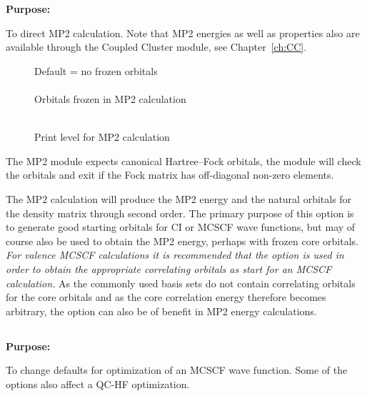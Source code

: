 {\bf Purpose:}

To direct MP2 calculation. Note that MP2 energies as well as
properties also are available through the Coupled Cluster module, see
Chapter~\ref{ch:CC}.

\begin{description}
\item[]
  Default = no frozen orbitals\\
   \\
  Orbitals frozen in MP2 calculation

\item[]
   \\
  Print level for MP2 calculation
\end{description}




The MP2 module expects canonical Hartree--Fock
orbitals, the module will
check the orbitals and exit if the Fock matrix has off-diagonal non-zero
elements.

The MP2 calculation will produce the MP2 energy and the natural orbitals
for the density matrix through second order.  The primary purpose of
this option is to generate good starting orbitals for CI or MCSCF wave
functions, but
may of course also be used to obtain the MP2 energy, perhaps with frozen
core orbitals. {\em For valence MCSCF calculations it is recommended that the
 option is used in order to obtain the appropriate
correlating orbitals as start
for an MCSCF calculation.\/}  As the commonly
used basis sets do not contain correlating orbitals for the core
orbitals and as the core correlation energy therefore becomes arbitrary,
the  option can also be of benefit in MP2 energy
calculations.


\pagebreak[3]
\subsection{\label{ref-optinp}}

{\bf Purpose:}

To change defaults for optimization of an MCSCF wave function.
Some of the options also affect a QC-HF optimization.

